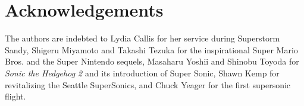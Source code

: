 \section*{Acknowledgements}

The authors are indebted to Lydia Callis for her service during Superstorm Sandy, Shigeru Miyamoto and Takashi Tezuka for the inspirational Super Mario Bros.\cite{mario} and the Super Nintendo sequels, Masaharu Yoshii and Shinobu Toyoda for \textit{Sonic the Hedgehog 2}\cite{sonic2} and its introduction of Super Sonic, Shawn Kemp for revitalizing the Seattle SuperSonics, and Chuck Yeager for the first supersonic flight.

